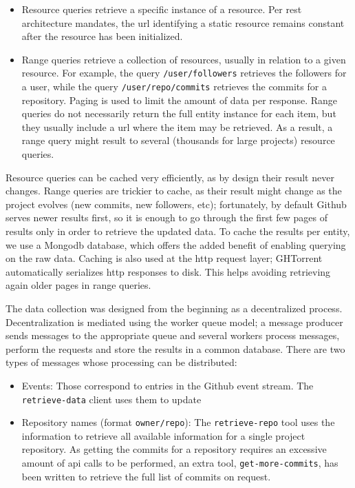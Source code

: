 \documentclass[conference]{IEEEtran}
\begin{document}
\begin{itemize}

  \item Resource queries retrieve a specific instance of a resource. Per 
    {\sc rest} architecture mandates, the {\sc url} identifying a static
    resource remains constant after the resource has been initialized. 

  \item Range queries retrieve a collection of resources, usually in relation
    to a given resource. For example, the query \texttt{/user/followers} 
    retrieves the followers for a user, while the query
    \texttt{/user/repo/commits} retrieves the commits for a repository. Paging
    is used to limit the amount of data per response. Range queries do not
    necessarily return the full entity instance for each item, but they
    usually include a {\sc url} where the item may be retrieved. As a result,
    a range query might result to several (thousands for large projects) 
    resource queries.

\end{itemize}

Resource queries can be cached very efficiently, as by design their result never
changes. Range queries are trickier to cache, as their result might change as
the project evolves (new commits, new followers, etc); fortunately, by default
Github serves newer results first, so it is enough to go through the first few
pages of results only in order to retrieve the updated data. To cache the
results per entity, we use a Mongo{\sc db} database, which offers the added
benefit of enabling querying on the raw data. Caching is also used at the {\sc
http} request layer; GHTorrent automatically serializes {\sc http} responses to
disk. This helps avoiding retrieving again older pages in range queries.

The data collection was designed from the beginning as a decentralized process.
Decentralization is mediated using the worker queue model; a message producer
sends messages to the appropriate queue and several workers process messages,
perform the requests and store the results in a common database. There are two
types of messages whose processing can be distributed:

\begin{itemize}

  \item Events: Those correspond to entries in the Github event stream. The
    \texttt{retrieve-data} client uses them to update

  \item Repository names (format \texttt{owner/repo}): The
    \texttt{retrieve-repo} tool uses the information to retrieve all available
    information for a single project repository. As getting the commits for a
    repository requires an excessive amount of {\sc api} calls to be performed,
    an extra tool, \texttt{get-more-commits}, has been written to retrieve the
    full list of commits on request. 

\end{itemize}
\end{document}
